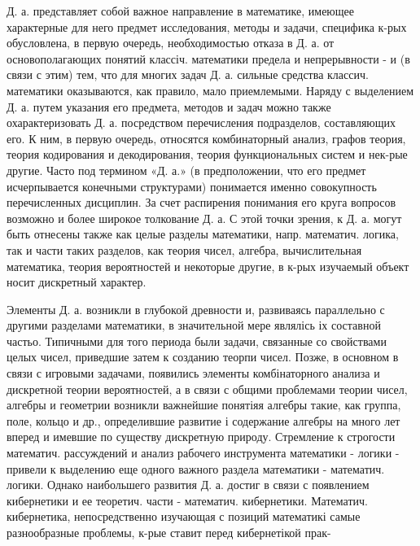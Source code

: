 \documentclass[10pt]{article}
\begin{document}
Д. а. представляет собой важное направление в математике, имеющее характерные для него предмет исследования, методы и задачи, специфика к-рых обусловлена, в первую очередь, необходимостью отказа в Д. а. от основополагающих понятий классіч. математики предела и непрерывности - и (в связи с этим) тем, что для многих задач Д. а. сильные средства классич. математики оказываются, как правило, мало приемлемыми. Наряду с выделением Д. а. путем указания его предмета, методов и задач можно также охарактеризовать Д. а. посредством перечисления подразделов, составляющих его. К ним, в первую очередь, относятся комбинаторный анализ, графов теория, теория кодирования и декодирования, теория функциональных систем и нек-рые другие. Часто под термином «Д. а.» (в предположении, что его предмет исчерпывается конечными структурами) понимается именно совокупность перечисленных дисциплин. За счет распирения понимания его круга вопросов возможно и более широкое толкование Д. а. С этой точки зрения, к Д. а. могут быть отнесены также как целые разделы математики, напр. математич. логика, так и части таких разделов, как теория чисел, алгебра, вычислительная математика, теория вероятностей и некоторые другие, в к-рых изучаемый объект носит дискретный характер.



Элементы Д. а. возникли в глубокой древности и, развиваясь параллельно с другими разделами математики, в значительной мере являлісь іх составной частьо. Типичными для того периода были задачи, связанные со свойствами целых чисел, приведшие затем к созданию теорпи чисел. Позже, в основном в связи с игровыми задачами, появились элементы комбінаторного анализа и дискретной теории вероятностей, а в связи с общими проблемами теории чисел, алгебры и геометрии возникли важнейшие понятіяя алгебры такие, как группа, поле, кольцо и др., определившие развитие і содержание алгебры на много лет вперед и имевшие по существу дискретную природу. Стремление к строгости математич. рассуждений и анализ рабочего инструмента математики - логики - привели к выделению еще одного важного раздела математики - математич. логики. Однако наибольшего развития Д. а. достиг в связи с появлением кибернетики и ее теоретич. части - математич. кибернетики. Математич. кибернетика, непосредственно изучающая с позиций математикі самые разнообразные проблемы, к-рые ставит перед кибернетікой прак-
\end{document}
